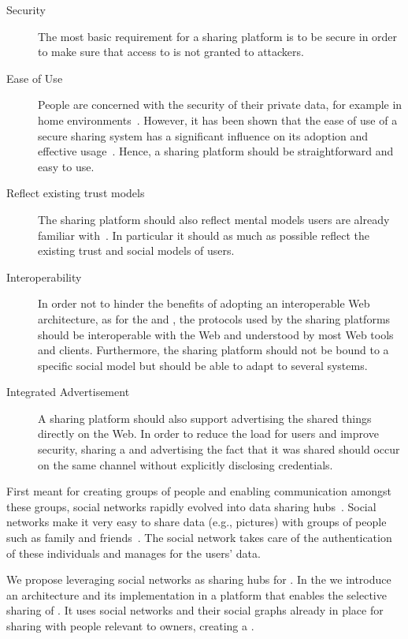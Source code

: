 \begin{description}
 \item[Security] The most basic requirement for a \WoT{} sharing platform is to be secure in order to make sure that access to \sts{} is not granted to attackers.
 \item[Ease of Use] People are concerned with the security of their private data, for example in home environments~\cite{Mazurek2010}. However, it has been shown that the ease of use of a secure sharing system has a significant influence on its adoption and effective usage~\cite{Ion2010}. Hence, a \WoT{} sharing platform should be straightforward and easy to use. 
 \item[Reflect existing trust models] The sharing platform should also reflect mental models users are already familiar with~\cite{Mazurek2010}. In particular it should as much as possible reflect the existing trust and social models of users. 
 \item[Interoperability] In order not to hinder the benefits of adopting an interoperable Web architecture, as for the \devLayer{} and \findLayer{}, the protocols used by the sharing platforms should be interoperable with the Web and understood by most Web tools and clients. Furthermore, the sharing platform should not be bound to a specific social model but should be able to adapt to several systems. 
 \item[Integrated Advertisement] A \WoT{} sharing platform should also support advertising the shared things directly on the Web. In order to reduce the load for users and improve security, sharing a \st{} and advertising the fact that it was shared should occur on the same channel without explicitly disclosing credentials.
\end{description}

First meant for creating groups of people and enabling communication amongst these groups, social networks rapidly evolved into data sharing hubs~\cite{Boyd2008}. Social networks make it very easy to share data (e.g., pictures) with groups of people such as family and friends~\cite{Miller2007}. The social network takes care of the authentication of these individuals and manages  for the users' data.

We propose leveraging social networks as sharing hubs for \sts{}. In the \shareLayer{} we introduce an architecture and its implementation in a platform that enables the selective sharing of \sts{}. It uses social networks and their social graphs already in place for sharing \sts{} with people relevant to \sts{} owners, creating a . 

